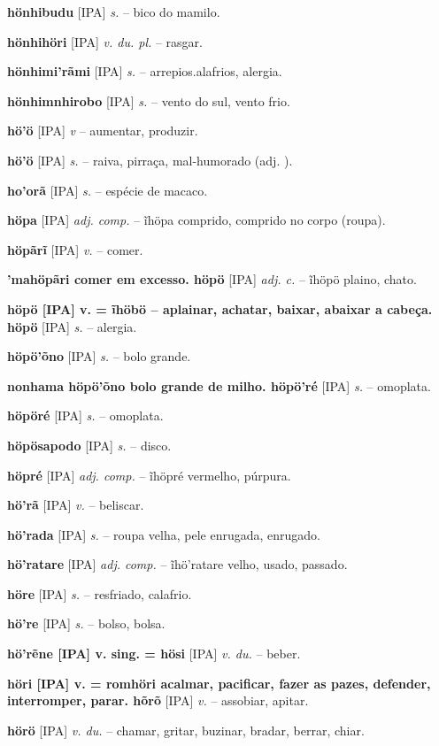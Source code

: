\textbf{hönhibudu} [IPA] \textit{s.} -- bico do mamilo.

\textbf{hönhihöri} [IPA] \textit{v. du. pl.} -- rasgar.

\textbf{hönhimi'rãmi} [IPA] \textit{s.} -- arrepios.alafrios, alergia.

\textbf{hönhimnhirobo} [IPA] \textit{s.} -- vento do sul, vento frio.

\textbf{hö'ö} [IPA] \textit{v} -- aumentar, produzir.

\textbf{hö'ö} [IPA] \textit{s.} -- raiva, pirraça, mal-humorado (adj. ).

\textbf{ho'orã} [IPA] \textit{s.} -- espécie de macaco.

\textbf{höpa} [IPA] \textit{adj. comp.} -- ĩhöpa comprido, comprido no corpo (roupa).

\textbf{höpãrĩ} [IPA] \textit{v.} -- comer.

\textbf{'mahöpãri comer em excesso. höpö} [IPA] \textit{adj. c.} -- ĩhöpö plaino, chato.

\textbf{höpö [IPA] v. = ĩhöbö -- aplainar, achatar, baixar, abaixar a cabeça. höpö} [IPA] \textit{s.} -- alergia.

\textbf{höpö'õno} [IPA] \textit{s.} -- bolo grande.

\textbf{nonhama höpö'õno bolo grande de milho. höpö'ré} [IPA] \textit{s.} -- omoplata.

\textbf{höpöré} [IPA] \textit{s.} -- omoplata.

\textbf{höpösapodo} [IPA] \textit{s.} -- disco.

\textbf{höpré} [IPA] \textit{adj. comp.} -- ĩhöpré vermelho, púrpura.

\textbf{hö'rã} [IPA] \textit{v.} -- beliscar.

\textbf{hö'rada} [IPA] \textit{s.} -- roupa velha, pele enrugada, enrugado.

\textbf{hö'ratare} [IPA] \textit{adj. comp.} -- ĩhö'ratare velho, usado, passado.

\textbf{höre} [IPA] \textit{s.} -- resfriado, calafrio.

\textbf{hö're} [IPA] \textit{s.} -- bolso, bolsa.

\textbf{hö'rẽne [IPA] v. sing. = hösi} [IPA] \textit{v. du.} -- beber.

\textbf{höri [IPA] v. = romhöri acalmar, pacificar, fazer as pazes, defender, interromper, parar. hõrõ} [IPA] \textit{v.} -- assobiar, apitar.

\textbf{hörö} [IPA] \textit{v. du.} -- chamar, gritar, buzinar, bradar, berrar, chiar.

